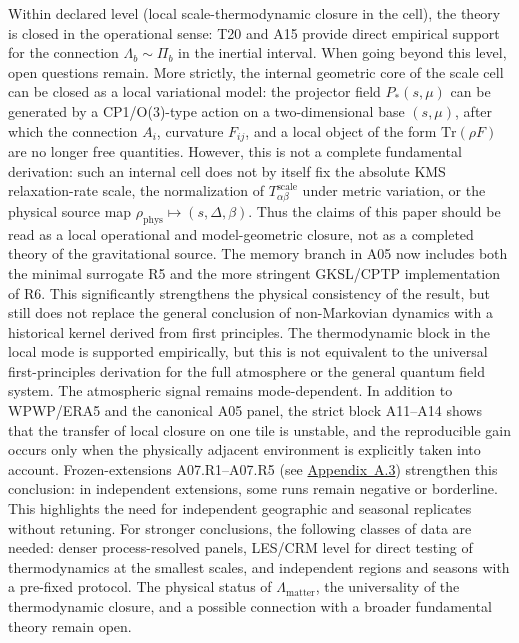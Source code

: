 \documentclass[11pt,a4paper]{article}
\theoremstyle{definition}
\theoremstyle{plain}
\theoremstyle{remark}
\begin{document}
Within declared level (local scale-thermodynamic closure in the cell), the theory is closed in the operational sense: T20 and A15 provide direct empirical support for the connection \(\Lambda_b\sim\Pi_b\) in the inertial interval.
When going beyond this level, open questions remain.
More strictly, the internal geometric core of the scale cell can be closed as a local variational model: the projector field \(P_*(s,\mu)\) can be generated by a CP1/O(3)-type action on a two-dimensional base \((s,\mu)\), after which the connection \(A_i\), curvature \(F_{ij}\), and a local object of the form \(\mathrm{Tr}(\rho F)\) are no longer free quantities.  However, this is not a complete fundamental derivation: such an internal cell does not by itself fix the absolute KMS relaxation-rate scale, the normalization of \(T_{\alpha\beta}^{\mathrm{scale}}\) under metric variation, or the physical source map \(\rho_{\mathrm{phys}}\mapsto(s,\Delta,\beta)\).  Thus the claims of this paper should be read as a local operational and model-geometric closure, not as a completed theory of the gravitational source.
The memory branch in A05 now includes both the minimal surrogate R5 and the more stringent GKSL/CPTP implementation of R6. This significantly strengthens the physical consistency of the result, but still does not replace the general conclusion of non-Markovian dynamics with a historical kernel derived from first principles.
The thermodynamic block in the local mode is supported empirically, but this is not equivalent to the universal first-principles derivation for the full atmosphere or the general quantum field system.
The atmospheric signal remains mode-dependent. In addition to WPWP/ERA5 and the canonical A05 panel, the strict block A11--A14 shows that the transfer of local closure on one tile is unstable, and the reproducible gain occurs only when the physically adjacent environment is explicitly taken into account. Frozen-extensions A07.R1--A07.R5 (see \hyperref[sec:appendix:atmo]{Appendix~A.3}) strengthen this conclusion: in independent extensions, some runs remain negative or borderline. This highlights the need for independent geographic and seasonal replicates without retuning.
For stronger conclusions, the following classes of data are needed: denser process-resolved panels, LES/CRM level for direct testing of thermodynamics at the smallest scales, and independent regions and seasons with a pre-fixed protocol.
The physical status of $\Lambda_{\mathrm{matter}}$, the universality of the thermodynamic closure, and a possible connection with a broader fundamental theory remain open.
\end{document}
